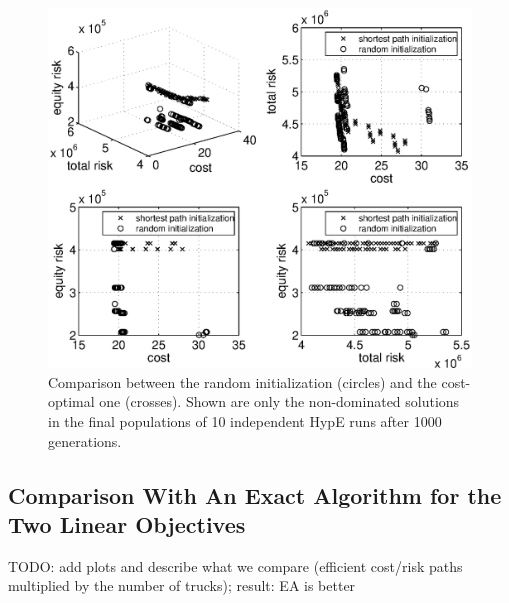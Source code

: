 \documentclass[preprint,12pt]{elsarticle}
\newcommand{\TODO}[1]{{\color{red}TODO: #1}}
\begin{document}
\begin{figure}%
	\includegraphics[width=\columnwidth]{../experiments/randVsCost/onlynondominated.eps}%
	\caption{\label{fig:onlynondominated} Comparison between the random initialization (circles) and the cost-optimal one (crosses). Shown are only the non-dominated solutions in the final populations of 10 independent HypE runs after 1000 generations.}
\end{figure}


\subsection{Comparison With An Exact Algorithm for the Two Linear Objectives}
\TODO{add plots and describe what we compare (efficient cost/risk paths multiplied by the number of trucks); result: EA is better}
\end{document}
